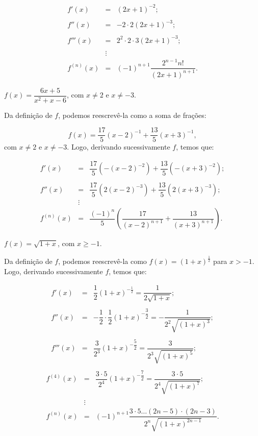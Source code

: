 \cleardoublepage\documentclass[../main.tex]{subfiles}
\begin{document}
\begin{exeresol}
\begin{compactenum}[a)]
\begin{resol}
\[ \begin{array}{rclcl} f'(x)&=& (2x+1)^{-2};\\ \\ f''(x)&=&-2\cdot 2(2x+1)^{-3};\\ \\ f'''(x)&=&2^2\cdot2\cdot 3(2x+1)^{-3};\\ \\ &\vdots&\\ f^{(n)}(x)&=&(-1)^{n+1}\dfrac{2^{n-1}n!}{(2x+1)^{n+1}}. \end{array} \]
    \end{resol}
    \item \(f(x)=\dfrac{6x+5}{x^2+x-6}\), com \(x\neq 2\) e \(x\neq -3\).
    
    \begin{resol}
        Da definição de \(f\), podemos reescrevê-la como a soma de frações:

\[ f(x)=\dfrac{17}{5}(x-2)^{-1}+ \dfrac{13}{5}(x+3)^{-1}, \]
com \(x\neq 2\) e \(x\neq -3\). Logo, derivando sucessivamente \(f\), temos que:

\[ \begin{array}{rclcl} f'(x)&=& \dfrac{17}{5}\left(- (x-2)^{-2}\right) +\dfrac{13}{5}\left(- (x+3)^{-2}\right) ;\\ \\ f''(x)&=&\dfrac{17}{5}\left(2(x-2)^{-3}\right) +\dfrac{13}{5}\left(2(x+3)^{-3}\right) ;\\ &\vdots&\\ f^{(n)}(x)&=&\dfrac{(-1)^{n}}{5}\left(\dfrac{17}{(x-2)^{n+1}}+ \dfrac{13}{(x+3)^{n+1}}\right). \end{array} \]
    \end{resol}
    \item \(f(x)=\sqrt{1+x}\), com \(x\geq- 1\).
    
    \begin{resol}
        Da definição de \(f\), podemos reescrevê-la como \(f(x)=(1+x)^{\frac{1}{2}}\) para \(x>-1\). Logo, derivando sucessivamente \(f\), temos que:

\[ \begin{array}{rclcl} f'(x)&=& \dfrac{1}{2} (1+x)^{-\frac{1}{2}}=\dfrac{1}{2\sqrt{1+x}} ;\\ \\ f''(x)&=&-\dfrac{1}{2}\cdot\dfrac{1}{2}(1+x)^{-\dfrac{3}{2}}=-\dfrac{1}{2^2\sqrt{(1+x)^3}};\\ \\ f'''(x)&=&\dfrac{3}{2^3}(1+x)^{-\dfrac{5}{2}}=\dfrac{3}{2^3\sqrt{(1+x)^5}};\\ \end{array} \] \[ \begin{array}{rclcl} f^{(4)}(x)&=&\dfrac{3\cdot 5}{2^4}(1+x)^{-\dfrac{7}{2}}=\dfrac{3\cdot 5}{2^4\sqrt{(1+x)^7}};\\ \\ &\vdots&\\ f^{(n)}(x)&=&(-1)^{n+1}\dfrac{3\cdot 5\dots(2n-5)\cdot(2n-3)}{2^n\sqrt{(1+x)^{2n-1}}}. \end{array} \]
    \end{resol}
  \end{compactenum}
\end{exeresol}
\end{document}
